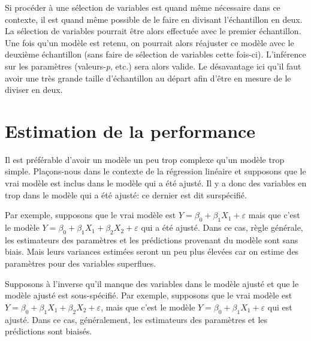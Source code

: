 \documentclass[
  11pt,
  letterpaper,
]{book}
\theoremstyle{definition}
\theoremstyle{remark}
\begin{document}
Si procéder à une sélection de variables est quand même nécessaire dans
ce contexte, il est quand même possible de le faire en divisant
l'échantillon en deux. La sélection de variables pourrait être alors
effectuée avec le premier échantillon. Une fois qu'un modèle est retenu,
on pourrait alors réajuster ce modèle avec le deuxième échantillon (sans
faire de sélection de variables cette fois-ci). L'inférence sur les
paramètres (valeurs-\emph{p}, etc.) sera alors valide. Le désavantage
ici qu'il faut avoir une très grande taille d'échantillon au départ afin
d'être en mesure de le diviser en deux.

\hypertarget{estimation-de-la-performance}{%
\section{Estimation de la
performance}\label{estimation-de-la-performance}}

Il est préférable d'avoir un modèle un peu trop complexe qu'un modèle
trop simple. Plaçons-nous dans le contexte de la régression linéaire et
supposons que le vrai modèle est inclus dans le modèle qui a été ajusté.
Il y a donc des variables en trop dans le modèle qui a été ajusté: ce
dernier est dit surspécifié.

Par exemple, supposons que le vrai modèle est
\(Y=\beta_0+\beta_1X_1+\varepsilon\) mais que c'est le modèle
\(Y=\beta_0+\beta_1X_1+\beta_2X_2+\varepsilon\) qui a été ajusté. Dans
ce cas, règle générale, les estimateurs des paramètres et les
prédictions provenant du modèle sont sans biais. Mais leurs variances
estimées seront un peu plus élevées car on estime des paramètres pour
des variables superflues.

Supposons à l'inverse qu'il manque des variables dans le modèle ajusté
et que le modèle ajusté est sous-spécifié. Par exemple, supposons que le
vrai modèle est \(Y=\beta_0+\beta_1X_1+\beta_2X_2+\varepsilon\), mais
que c'est le modèle \(Y=\beta_0+\beta_1X_1+\varepsilon\) qui est ajusté.
Dans ce cas, généralement, les estimateurs des paramètres et les
prédictions sont biaisés.
\end{document}
